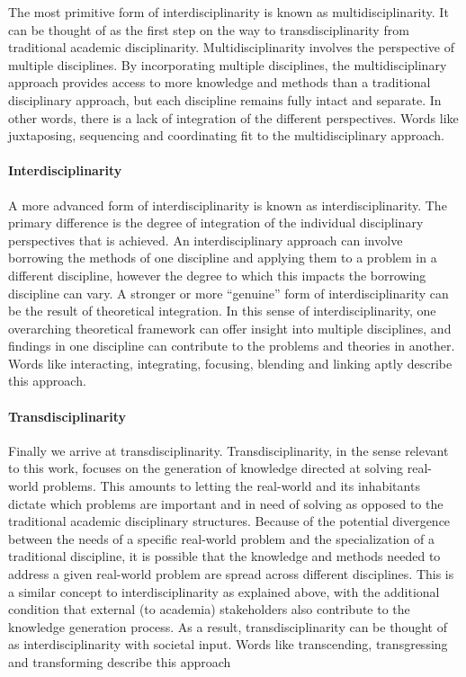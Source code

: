 \documentclass[a4paper]{article}
\begin{document}
The most primitive form of interdisciplinarity is known as
multidisciplinarity. It can be thought of as the first step on the way to
transdisciplinarity from traditional academic disciplinarity.
Multidisciplinarity involves the perspective of multiple disciplines. By
incorporating multiple disciplines, the multidisciplinary approach provides
access to more knowledge and methods than a traditional disciplinary approach,
but each discipline remains fully intact and separate. In other words, there
is a lack of integration of the different perspectives. Words like
juxtaposing, sequencing and coordinating fit to the multidisciplinary
approach.

\paragraph{Interdisciplinarity}

A more advanced form of interdisciplinarity is known as interdisciplinarity.
The primary difference is the degree of integration of the individual
disciplinary perspectives that is achieved. An interdisciplinary approach can
involve borrowing the methods of one discipline and applying them to a problem
in a different discipline, however the degree to which this impacts the
borrowing discipline can vary. A stronger or more ``genuine'' form of
interdisciplinarity can be the result of theoretical integration. In this
sense of interdisciplinarity, one overarching theoretical framework can offer
insight into multiple disciplines, and findings in one discipline can
contribute to the problems and theories in another. Words like interacting,
integrating, focusing, blending and linking aptly describe this approach.

\paragraph{Transdisciplinarity}

Finally we arrive at transdisciplinarity. Transdisciplinarity, in the sense
relevant to this work, focuses on the generation of knowledge directed at
solving real-world problems. This amounts to letting the real-world and its
inhabitants dictate which problems are important and in need of solving as
opposed to the traditional academic disciplinary structures. Because of the
potential divergence between the needs of a specific real-world problem and
the specialization of a traditional discipline, it is possible that the
knowledge and methods needed to address a given real-world problem are spread
across different disciplines. This is a similar concept to
interdisciplinarity as explained above, with the additional condition that
external (to academia) stakeholders also contribute to the knowledge
generation process. As a result, transdisciplinarity can be thought of as
interdisciplinarity with societal input. Words like transcending,
transgressing and transforming describe this approach
\end{document}
